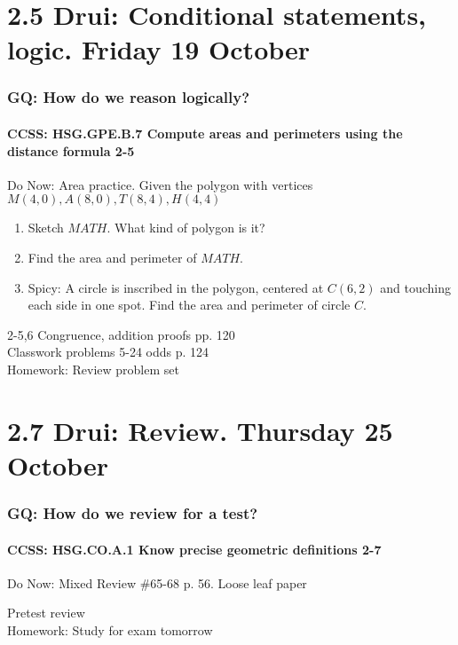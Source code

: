 \documentclass{beamer}
\begin{document}
\section{2.5 Drui: Conditional statements, logic. Friday 19 October}
  \frame
  {
    \frametitle{GQ: How do we reason logically?}
    \framesubtitle{CCSS: HSG.GPE.B.7 Compute areas and perimeters using the distance formula  \alert{2-5}}

    \begin{block}{Do Now: Area practice. Given the polygon with vertices $M(4,0), A(8,0), T(8,4), H(4,4)$}
    \begin{enumerate}
        \item Sketch $MATH$. What kind of polygon is it?
        \item Find the area and perimeter of $MATH$.
        \item Spicy: A circle is inscribed in the polygon, centered at $C(6,2)$ and touching each side in one spot. Find the area and perimeter of circle $C$.
    \end{enumerate}
    \end{block}
    2-5,6 Congruence, addition proofs  pp. 120\\
    Classwork problems 5-24 odds p. 124\\
    \vspace{0.5cm}
    Homework: Review problem set
  }

\section{2.7 Drui: Review. Thursday 25 October}
  \frame
  {
  \frametitle{GQ: How do we review for a test?}
  \framesubtitle{CCSS: HSG.CO.A.1 Know precise geometric definitions  \alert{2-7}}

  \begin{block}{Do Now: Mixed Review \#65-68 p. 56. Loose leaf paper}
  \end{block}
  Pretest review\\
  \vspace{0.5cm}
  Homework: Study for \alert{exam tomorrow}
}
\end{document}
